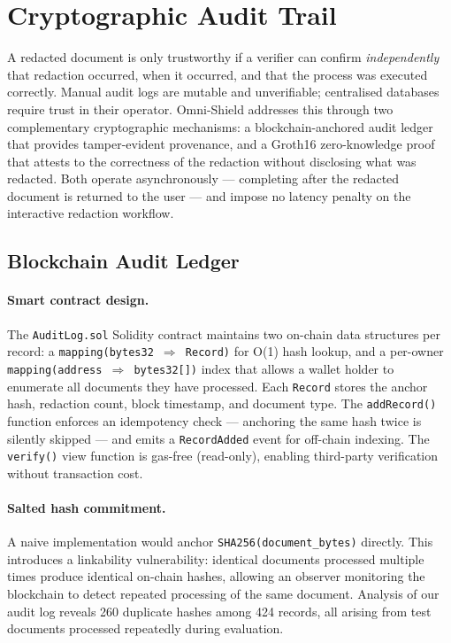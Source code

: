 \section{Cryptographic Audit Trail}
\label{sec:crypto}

A redacted document is only trustworthy if a verifier
can confirm \emph{independently} that redaction
occurred, when it occurred, and that the process was
executed correctly.
Manual audit logs are mutable and unverifiable;
centralised databases require trust in their operator.
Omni-Shield addresses this through two complementary
cryptographic mechanisms: a blockchain-anchored audit
ledger that provides tamper-evident provenance, and
a Groth16 zero-knowledge proof that attests to the
correctness of the redaction without disclosing
what was redacted.
Both operate asynchronously --- completing after the
redacted document is returned to the user --- and
impose no latency penalty on the interactive
redaction workflow.

\subsection{Blockchain Audit Ledger}

\paragraph{Smart contract design.}
The \texttt{AuditLog.sol} Solidity contract maintains
two on-chain data structures per record:
a \texttt{mapping(bytes32\,$\Rightarrow$\,Record)}
for O(1) hash lookup, and a per-owner
\texttt{mapping(address\,$\Rightarrow$\,bytes32[])}
index that allows a wallet holder to enumerate all
documents they have processed.
Each \texttt{Record} stores the anchor hash,
redaction count, block timestamp, and document type.
The \texttt{addRecord()} function enforces an
idempotency check --- anchoring the same hash twice
is silently skipped --- and emits a
\texttt{RecordAdded} event for off-chain indexing.
The \texttt{verify()} view function is gas-free
(read-only), enabling third-party verification
without transaction cost.

\paragraph{Salted hash commitment.}
A naive implementation would anchor
\texttt{SHA256(document\_bytes)} directly.
This introduces a linkability vulnerability: identical
documents processed multiple times produce identical
on-chain hashes, allowing an observer monitoring the
blockchain to detect repeated processing of the same
document.
Analysis of our audit log reveals 260 duplicate
hashes among 424 records, all arising from test
documents processed repeatedly during evaluation.

